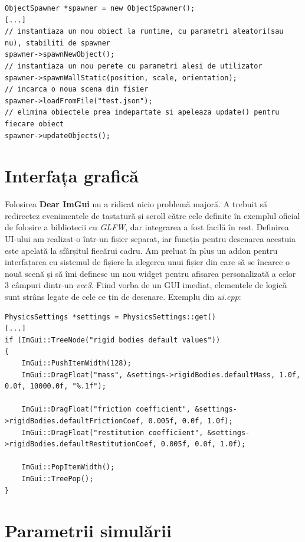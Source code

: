 \documentclass[12pt,a4paper]{report}
\begin{document}
\begin{lstlisting}[style=myC++]
ObjectSpawner *spawner = new ObjectSpawner();
[...]
// instantiaza un nou obiect la runtime, cu parametri aleatori(sau nu), stabiliti de spawner
spawner->spawnNewObject();
// instantiaza un nou perete cu parametri alesi de utilizator                             
spawner->spawnWallStatic(position, scale, orientation);
// incarca o noua scena din fisier
spawner->loadFromFile("test.json");
// elimina obiectele prea indepartate si apeleaza update() pentru fiecare obiect
spawner->updateObjects();
\end{lstlisting}

\section {Interfața grafică}
Folosirea \textbf{Dear ImGui} nu a ridicat nicio problemă majoră. A trebuit să redirectez evenimentele de tastatură și scroll către cele definite în exemplul oficial de folosire a bibliotecii cu \textit{GLFW}, dar integrarea a fost facilă în rest. Definirea UI-ului am realizat-o într-un fișier separat, iar funcția pentru desenarea acestuia este apelată la sfârșitul fiecărui cadru. Am preluat în plus un addon pentru interfațarea cu sistemul de fișiere la alegerea unui fișier din care să se încarce o nouă scenă și să îmi definesc un nou widget pentru afișarea personalizată a celor 3 câmpuri dintr-un \textit{vec3}. Fiind vorba de un GUI imediat, elementele de logică sunt strâns legate de cele ce țin de desenare. Exemplu din \textit{ui.cpp}:

\begin{lstlisting}[style=myC++, label={code:imguiExample}, caption = {widget-urile pentru stabilirea parametrilor impliciti ai corpurilor solide}]
PhysicsSettings *settings = PhysicsSettings::get()
[...]
if (ImGui::TreeNode("rigid bodies default values"))
{
	ImGui::PushItemWidth(128);
	ImGui::DragFloat("mass", &settings->rigidBodies.defaultMass, 1.0f, 0.0f, 10000.0f, "%.1f");

	ImGui::DragFloat("friction coefficient", &settings->rigidBodies.defaultFrictionCoef, 0.005f, 0.0f, 1.0f);
	ImGui::DragFloat("restitution coefficient", &settings->rigidBodies.defaultRestitutionCoef, 0.005f, 0.0f, 1.0f);

	ImGui::PopItemWidth();
	ImGui::TreePop();
}
\end{lstlisting}

\section {Parametrii simulării}
\end{document}

